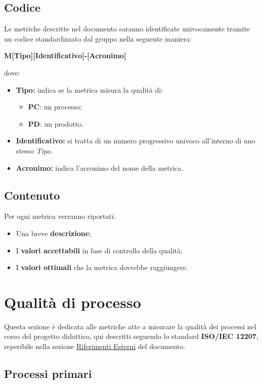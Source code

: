 \subsection{Codice}
Le metriche descritte nel documento saranno identificate univocamente tramite un codice standardizzato dal gruppo nella seguente maniera:
\begin{center}
    \textbf{M[Tipo][Identificativo]-[Acronimo]}
\end{center}
dove:
\begin{itemize}
    \item \textbf{Tipo:} indica se la metrica misura la qualità di:
        \begin{itemize}
            \item \textbf{PC}: un processo;
            \item \textbf{PD}: un prodotto.
        \end{itemize}                 
    \item \textbf{Identificativo:} si tratta di un numero progressivo univoco all'interno di uno stesso \textit{Tipo}.
    \item \textbf{Acronimo:} indica l'acronimo del nome della metrica.
\end{itemize}
\subsection{Contenuto}
Per ogni metrica verranno riportati:
\begin{itemize}
    \item Una breve \textbf{descrizione};
    \item I \textbf{valori accettabili} in fase di controllo della qualità;
    \item I \textbf{valori ottimali} che la metrica dovrebbe raggiungere.
\end{itemize}


\newpage

\section{Qualità di processo}\label{sec:qualita_di_processo}
Questa sezione è dedicata alle metriche atte a misurare la qualità dei processi nel corso del progetto didattico, qui descritti seguendo lo standard \textbf{ISO/IEC 12207}, reperibile nella sezione \hyperref[sec:riferimenti_esterni]{Riferimenti Esterni} del documento.
\subsection{Processi primari}
